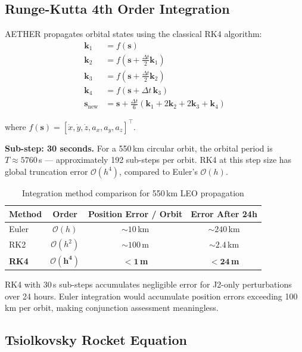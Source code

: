 \documentclass[12pt,a4paper]{article}
\begin{document}
\subsection{Runge-Kutta 4th Order Integration}

AETHER propagates orbital states using the classical RK4 algorithm:
\begin{align}
\mathbf{k}_1 &= f(\mathbf{s}) \\
\mathbf{k}_2 &= f\!\left(\mathbf{s} + \tfrac{\Delta t}{2}\mathbf{k}_1\right) \\
\mathbf{k}_3 &= f\!\left(\mathbf{s} + \tfrac{\Delta t}{2}\mathbf{k}_2\right) \\
\mathbf{k}_4 &= f(\mathbf{s} + \Delta t\,\mathbf{k}_3) \\
\mathbf{s}_{\text{new}} &= \mathbf{s} + \frac{\Delta t}{6}\left(\mathbf{k}_1 + 2\mathbf{k}_2 + 2\mathbf{k}_3 + \mathbf{k}_4\right)
\end{align}

where $f(\mathbf{s}) = [\dot{x}, \dot{y}, \dot{z}, a_x, a_y, a_z]^\top$.

\textbf{Sub-step: 30 seconds.} For a 550\,km circular orbit, the orbital period is $T \approx 5760$\,s --- approximately 192 sub-steps per orbit. RK4 at this step size has global truncation error $\mathcal{O}(h^4)$, compared to Euler's $\mathcal{O}(h)$.

\begin{table}[H]
\centering
\caption{Integration method comparison for 550\,km LEO propagation}
\begin{tabular}{lccc}
\toprule
\textbf{Method} & \textbf{Order} & \textbf{Position Error / Orbit} & \textbf{Error After 24h} \\
\midrule
Euler & $\mathcal{O}(h)$ & $\sim 10$\,km & $\sim 240$\,km \\
RK2 & $\mathcal{O}(h^2)$ & $\sim 100$\,m & $\sim 2.4$\,km \\
\textbf{RK4} & $\boldsymbol{\mathcal{O}(h^4)}$ & $\boldsymbol{< 1}$\,\textbf{m} & $\boldsymbol{< 24}$\,\textbf{m} \\
\bottomrule
\end{tabular}
\end{table}

RK4 with 30\,s sub-steps accumulates negligible error for J2-only perturbations over 24 hours. Euler integration would accumulate position errors exceeding 100\,km per orbit, making conjunction assessment meaningless.

\subsection{Tsiolkovsky Rocket Equation}
\end{document}
